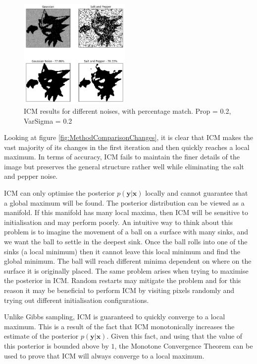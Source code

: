 \documentclass[10pt, a4paper, twocolumn]{article} %
\begin{document}
\begin{figure}
    \centering
    \includegraphics[width = 0.48\textwidth]{images/ICMFinal.png}
    \caption{ICM results for different noises, with percentage match. Prop = 0.2, VarSigma = 0.2}
    \label{fig:ICMfinal}
\end{figure}

Looking at figure \ref{fig:MethodComparisonChanges}, it is clear that ICM makes the vast majority of its changes in the first iteration and then quickly reaches a local maximum. In terms of accuracy, ICM fails to maintain the finer details of the image but preserves the general structure rather well while eliminating the salt and pepper noise. 

ICM can only optimise the posterior $p(\mathbf{y}|\mathbf{x})$ locally and cannot guarantee that a global maximum will be found. The posterior distribution can be viewed as a manifold. If this manifold has many local maxima, then ICM will be sensitive to initialisation and may perform poorly. An intuitive way to think about this problem is to imagine the movement of a ball on a surface with many sinks, and we want the ball to settle in the deepest sink. Once the ball rolls into one of the sinks (a local minimum) then it cannot leave this local minimum and find the global minimum. The ball will reach different minima dependent on where on the surface it is originally placed. The same problem arises when trying to maximise the posterior in ICM. Random restarts may mitigate the problem and for this reason it may be beneficial to perform ICM by visiting pixels randomly and trying out different initialisation configurations.

Unlike Gibbs sampling, ICM is guaranteed to quickly converge to a local maximum. This is a result of the fact that ICM monotonically increases the estimate of the posterior $p(\mathbf{y}|\mathbf{x})$. Given this fact, and using that the value of this posterior is bounded above by $1$, the Monotone Convergence Theorem can be used to prove that ICM will always converge to a local maximum.\\ 
\end{document}
